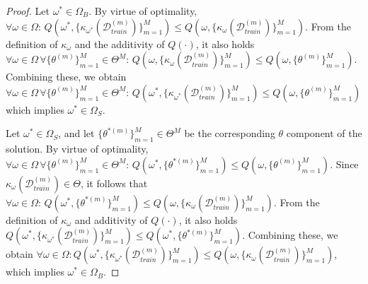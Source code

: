 \documentclass[3p,times,twocolumn]{elsarticle}
\newtheorem{proof}{Proof of Proposition}
\begin{document}
\begin{proof}
    Let $\omega^{*} \in \Omega_{B}$.
    By virtue of optimality, $\forall \omega \in \Omega:\, Q(\omega^{*},\{\kappa_{\omega^{*}}(\mathcal{D}_{train}^{(m)})\}_{m=1}^{M}) \leq Q(\omega,\{\kappa_{\omega}(\mathcal{D}_{train}^{(m)})\}_{m=1}^{M})$.
    From the definition of $\kappa_{\omega}$ and the additivity of $Q(\cdot)$, it also holds $\forall \omega \in \Omega \, \forall \{\theta^{(m)}\}_{m=1}^{M} \in \Theta^{M}:\, Q(\omega,\{\kappa_{\omega}(\mathcal{D}_{train}^{(m)})\}_{m=1}^{M}) \leq Q(\omega,\{\theta^{(m)}\}_{m=1}^{M})$.
    Combining these, we obtain $\forall \omega \in \Omega \, \forall \{\theta^{(m)}\}_{m=1}^{M} \in \Theta^{M}:\,Q(\omega^{*},\{\kappa_{\omega^{*}}(\mathcal{D}_{train}^{(m)})\}_{m=1}^{M}) \leq Q(\omega,\{\theta^{(m)}\}_{m=1}^{M})$ which implies $\omega^{*} \in \Omega_{S}$.

    Let $\omega^{*} \in \Omega_{S}$, and let $\{\theta^{*(m)}\}_{m=1}^{M} \in \Theta^{M}$ be the corresponding $\theta$ component of the solution.
    By virtue of optimality, $\forall \omega \in \Omega \, \forall \{\theta^{(m)}\}_{m=1}^{M} \in \Theta^{M}:\,Q(\omega^{*},\{\theta^{*(m)}\}_{m=1}^{M}) \leq Q(\omega,\{\theta^{(m)}\}_{m=1}^{M})$.
    Since $\kappa_{\omega}(\mathcal{D}_{train}^{(m)}) \in \Theta$, it follows that $\forall \omega \in \Omega:\,Q(\omega^{*},\{\theta^{*(m)}\}_{m=1}^{M}) \leq Q(\omega,\{\kappa_{\omega}(\mathcal{D}_{train}^{(m)})\}_{m=1}^{M})$.
    From the definition of $\kappa_{\omega}$ and additivity of $Q(\cdot)$, it also holds $Q(\omega^{*},\{\kappa_{\omega^{*}}(\mathcal{D}_{train}^{(m)})\}_{m=1}^{M}) \leq Q(\omega^{*},\{\theta^{*(m)}\}_{m=1}^{M})$.
    Combining these, we obtain $\forall \omega \in \Omega:Q(\omega^{*},\{\kappa_{\omega^{*}}(\mathcal{D}_{train}^{(m)})\}_{m=1}^{M}) \leq Q(\omega,\{\kappa_{\omega}(\mathcal{D}_{train}^{(m)})\}_{m=1}^{M})$, which implies $\omega^{*} \in \Omega_{B}$.
\end{proof}


\end{document}
